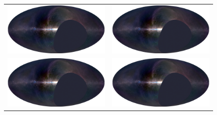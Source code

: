 \documentclass[twocolumn]{aastex6}
\begin{document}
\begin{figure}[ht]
    \centering
    \begin{tabular}{cc}
        \includegraphics[width=\columnwidth, draft]{maps/rgb-map} &
        \includegraphics[width=\columnwidth, draft]{maps/rgb-map} \\
        \includegraphics[width=\columnwidth, draft]{maps/rgb-map} &
        \includegraphics[width=\columnwidth, draft]{maps/rgb-map} \\

\end{tabular}
\end{figure}
\end{document}
